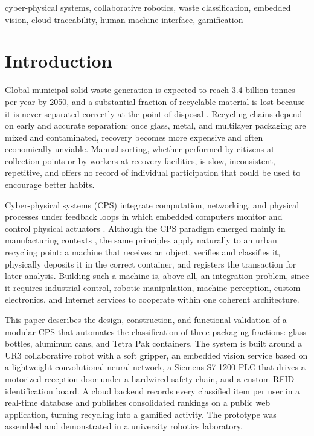 \documentclass[conference]{IEEEtran}
\begin{document}
\begin{IEEEkeywords}
cyber-physical systems, collaborative robotics, waste classification, embedded vision, cloud traceability, human-machine interface, gamification
\end{IEEEkeywords}

\section{Introduction}
Global municipal solid waste generation is expected to reach 3.4 billion tonnes per year by 2050, and a substantial fraction of recyclable material is lost because it is never separated correctly at the point of disposal \cite{b1}. Recycling chains depend on early and accurate separation: once glass, metal, and multilayer packaging are mixed and contaminated, recovery becomes more expensive and often economically unviable. Manual sorting, whether performed by citizens at collection points or by workers at recovery facilities, is slow, inconsistent, repetitive, and offers no record of individual participation that could be used to encourage better habits.

Cyber-physical systems (CPS) integrate computation, networking, and physical processes under feedback loops in which embedded computers monitor and control physical actuators \cite{b2}. Although the CPS paradigm emerged mainly in manufacturing contexts \cite{b3}, the same principles apply naturally to an urban recycling point: a machine that receives an object, verifies and classifies it, physically deposits it in the correct container, and registers the transaction for later analysis. Building such a machine is, above all, an integration problem, since it requires industrial control, robotic manipulation, machine perception, custom electronics, and Internet services to cooperate within one coherent architecture.

This paper describes the design, construction, and functional validation of a modular CPS that automates the classification of three packaging fractions: glass bottles, aluminum cans, and Tetra Pak containers. The system is built around a UR3 collaborative robot with a soft gripper, an embedded vision service based on a lightweight convolutional neural network, a Siemens S7-1200 PLC that drives a motorized reception door under a hardwired safety chain, and a custom RFID identification board. A cloud backend records every classified item per user in a real-time database and publishes consolidated rankings on a public web application, turning recycling into a gamified activity. The prototype was assembled and demonstrated in a university robotics laboratory.
\end{document}
